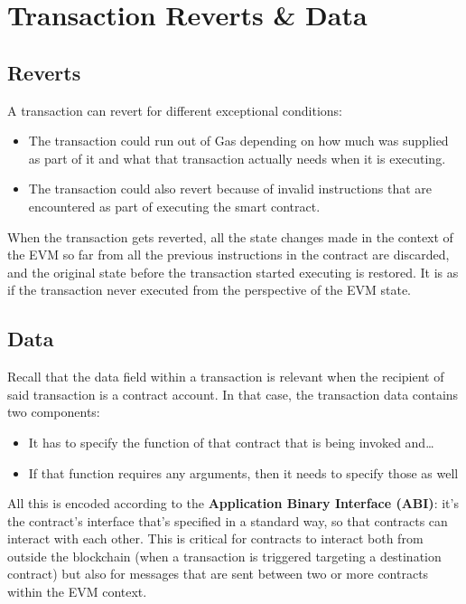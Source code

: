 \section{Transaction Reverts \& Data}\label{transaction-reverts-data}

\subsection{Reverts}\label{reverts}

A transaction can revert for different exceptional conditions:

\begin{itemize}
\tightlist
\item
  The transaction could run out of Gas depending on how much was
  supplied as part of it and what that transaction actually needs when
  it is executing.
\item
  The transaction could also revert because of invalid instructions that
  are encountered as part of executing the smart contract.
\end{itemize}

When the transaction gets reverted, all the state changes made in the
context of the EVM so far from all the previous instructions in the
contract are discarded, and the original state before the transaction
started executing is restored. It is as if the transaction never
executed from the perspective of the EVM state.

\subsection{Data}\label{data}

Recall that the data field within a transaction is relevant when the
recipient of said transaction is a contract account. In that case, the
transaction data contains two components:

\begin{itemize}
\tightlist
\item
  It has to specify the function of that contract that is being invoked
  and\ldots{}
\item
  If that function requires any arguments, then it needs to specify
  those as well
\end{itemize}

All this is encoded according to the \textbf{Application Binary
Interface (ABI)}: it's the contract's interface that's specified in a
standard way, so that contracts can interact with each other. This is
critical for contracts to interact both from outside the blockchain
(when a transaction is triggered targeting a destination contract) but
also for messages that are sent between two or more contracts within the
EVM context.

